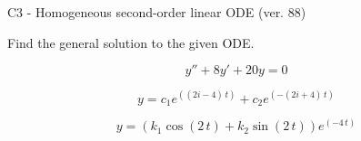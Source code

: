 \begin{exercise}
  \begin{exerciseTitle}C3 - Homogeneous second-order linear ODE (ver. 88)\end{exerciseTitle}
  \begin{exerciseStatement}
    
Find the general solution to the given ODE.

    
\[y''+8y'+20y = 0\]

  \end{exerciseStatement}
  \begin{exerciseAnswer}
    
\[y= c_{1} e^{\left(\left(2 i - 4\right) \, t\right)} + c_{2} e^{\left(-\left(2 i + 4\right) \, t\right)}\]

    
\[y= {\left(k_{1} \cos\left(2 \, t\right) + k_{2} \sin\left(2 \, t\right)\right)} e^{\left(-4 \, t\right)}\]

  \end{exerciseAnswer}
\end{exercise}
